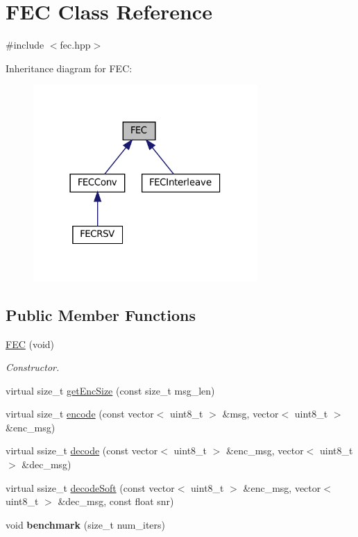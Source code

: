 \hypertarget{classFEC}{}\section{F\+EC Class Reference}
\label{classFEC}


{\ttfamily \#include $<$fec.\+hpp$>$}



Inheritance diagram for F\+EC\+:\nopagebreak
\begin{figure}[H]
\begin{center}
\leavevmode
\includegraphics[width=242pt]{classFEC__inherit__graph}
\end{center}
\end{figure}
\subsection*{Public Member Functions}
\begin{DoxyCompactItemize}
\item 
\mbox{\label{classFEC_acff6b0b2b7266f73c45eeea65b7579f2}} 
\hyperlink{classFEC_acff6b0b2b7266f73c45eeea65b7579f2}{F\+EC} (void)
\begin{DoxyCompactList}\small\item\em Constructor. \end{DoxyCompactList}\item 
virtual size\+\_\+t \hyperlink{classFEC_a6504a5f7d5e1344538c25ed5481d0adb}{get\+Enc\+Size} (const size\+\_\+t msg\+\_\+len)
\item 
virtual size\+\_\+t \hyperlink{classFEC_abc86f45390c50b3cd90cade73a137355}{encode} (const vector$<$ uint8\+\_\+t $>$ \&msg, vector$<$ uint8\+\_\+t $>$ \&enc\+\_\+msg)
\item 
virtual ssize\+\_\+t \hyperlink{classFEC_aec87f2d9c2305283d226197bf76891cf}{decode} (const vector$<$ uint8\+\_\+t $>$ \&enc\+\_\+msg, vector$<$ uint8\+\_\+t $>$ \&dec\+\_\+msg)
\item 
virtual ssize\+\_\+t \hyperlink{classFEC_a04ba63e1dac24bed00f448f9198e34b5}{decode\+Soft} (const vector$<$ uint8\+\_\+t $>$ \&enc\+\_\+msg, vector$<$ uint8\+\_\+t $>$ \&dec\+\_\+msg, const float snr)
\item 
\mbox{\label{classFEC_aaccc10a6d38eb005f1f287119bdaecd8}} 
void {\bfseries benchmark} (size\+\_\+t num\+\_\+iters)
\end{DoxyCompactItemize}
